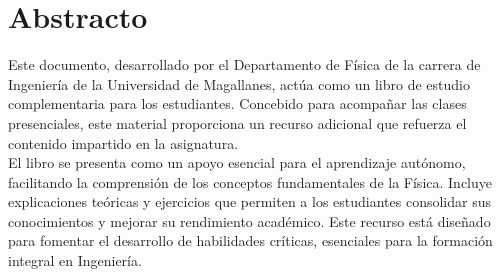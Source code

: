 \thispagestyle{plain} %

\chapter*{Abstracto} %

Este documento, desarrollado por el Departamento de Física de la carrera de Ingeniería de la Universidad de Magallanes, actúa como un libro de estudio complementaria para los estudiantes. Concebido para acompañar las clases presenciales, este material proporciona un recurso adicional que refuerza el contenido impartido en la asignatura.
\\[0.7cm]
El libro se presenta como un apoyo esencial para el aprendizaje autónomo, facilitando la comprensión de los conceptos fundamentales de la Física. Incluye explicaciones teóricas y ejercicios que permiten a los estudiantes consolidar sus conocimientos y mejorar su rendimiento académico. Este recurso está diseñado para fomentar el desarrollo de habilidades críticas, esenciales para la formación integral en Ingeniería.




